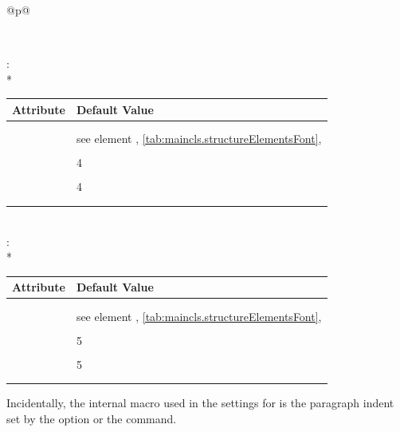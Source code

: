 \begin{longtable}{@{}p{\columnwidth}@{}}
\begin{tabularx}{\linewidth}{ll}
    \PValue{tocstyle}    & \PValue{section} \\
    \bottomrule
    \end{tabularx} \\
    \addlinespace[\normalbaselineskip]
    : \\*
    \begin{tabularx}{\linewidth}{ll}
    \toprule
    Attribute & Default Value \\
    \midrule\nopagebreak
    \PValue{afterskip}   & \PValue{-1em} \\
    \PValue{beforeskip}  & \PValue{3.25ex plus 1ex minus .2ex} \\
    \PValue{font}        & see element \DescRef{maincls.fontelement.paragraph},
                           \autoref{tab:maincls.structureElementsFont},
                           \autopageref{tab:maincls.structureElementsFont} \\
    \PValue{indent}      & \PValue{0pt} \\
    \PValue{level}       & 4 \\
    \PValue{tocindent}   & \PValue{10em}\\
    \PValue{toclevel}    & 4 \\
    \PValue{tocnumwidth} & \PValue{5em}\\
    \PValue{tocstyle}    & \PValue{section} \\
    \bottomrule
    \end{tabularx} \\
    \addlinespace[\normalbaselineskip]
    :  \\*
    \begin{tabularx}{\linewidth}{ll}
    \toprule
    Attribute & Default Value \\
    \midrule\nopagebreak
    \PValue{afterskip}   & \PValue{-1em} \\
    \PValue{beforeskip}  & \PValue{3.25ex plus 1ex minus .2ex} \\
    \PValue{font}        & see element
                           \DescRef{maincls.fontelement.subparagraph},
                           \autoref{tab:maincls.structureElementsFont},
                           \autopageref{tab:maincls.structureElementsFont} \\
    \PValue{indent}      & \Macro{scr@parindent} \\
    \PValue{level}       & 5 \\
    \PValue{tocindent}   & \PValue{12em}\\
    \PValue{toclevel}    & 5 \\
    \PValue{tocnumwidth} & \PValue{6em}\\
    \PValue{tocstyle}    & \PValue{section} \\
    \bottomrule
    \end{tabularx}
  \end{longtable}
Incidentally, the internal macro  used in the settings
for  is the paragraph indent set by the
 option or the
 command.
\EndIndexGroup



